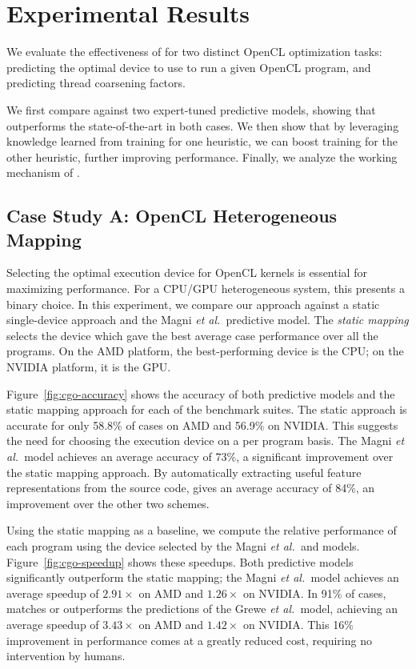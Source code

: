 \section{Experimental Results} \label{sec:results}

We evaluate the effectiveness of \DeepTune for two distinct OpenCL optimization tasks: predicting the optimal device to use to run a given OpenCL program, and predicting thread coarsening factors.

We first compare \DeepTune against two expert-tuned predictive models, showing that \DeepTune outperforms the state-of-the-art in both cases. We then show that by leveraging knowledge learned from training \DeepTune for one heuristic, we can boost training for the other heuristic, further improving performance. Finally, we analyze the working mechanism of \DeepTune.


\subsection{Case Study A: OpenCL Heterogeneous Mapping}

Selecting the optimal execution device for OpenCL kernels is essential for maximizing performance. For a CPU/GPU heterogeneous system, this presents a binary choice. In this experiment, we compare our approach against a static single-device approach and the Magni \emph{et al.\ }predictive model. The \emph{static mapping} selects the device which gave the best average case performance over all the programs. On the AMD platform, the best-performing device is the CPU; on the NVIDIA platform, it is the GPU.

Figure~\ref{fig:cgo-accuracy} shows the accuracy of both predictive models and the static mapping approach for each of the benchmark suites. The static approach is accurate for only 58.8\% of cases on AMD and 56.9\% on NVIDIA. This suggests the need for choosing the execution device on a per program basis. The Magni \emph{et al.\ }model achieves an average accuracy of 73\%, a significant improvement over the static mapping approach. By automatically extracting useful feature representations from the source code, \DeepTune gives an average accuracy of 84\%, an improvement over the other two schemes.

Using the static mapping as a baseline, we compute the relative performance of each program using the device selected by the Magni \emph{et al.\ }and \DeepTune models. Figure~\ref{fig:cgo-speedup} shows these speedups. Both predictive models significantly outperform the static mapping; the Magni \emph{et al.\ }model achieves an average speedup of $2.91\times$ on AMD and $1.26\times$ on NVIDIA. In 91\% of cases, \DeepTune matches or outperforms the predictions of the Grewe \emph{et al.\ }model, achieving an average speedup of $3.43\times$ on AMD and $1.42\times$ on NVIDIA. This 16\% improvement in performance comes at a greatly reduced cost, requiring no intervention by humans.

